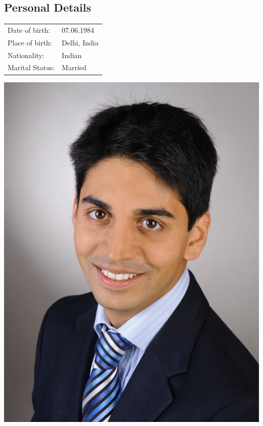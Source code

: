 \documentclass[11pt,a4paper]{article}
\begin{document}
\begin{center}
\begin{minipage}{1.0\textwidth}
\begin{minipage}{.50\textwidth}
\begin{minipage}{0.85\textwidth}
\section{Personal Details}
\begin{center}
\begin{minipage}{0.85\textwidth}
\begin{tabular}{ll}
	Date of birth:& 07.06.1984\\
	Place of birth:&  Delhi, India\\
	Nationality:& Indian\\
	Marital Status:& Married\\
\end{tabular}
\end{minipage}
\end{center}
\end{minipage}
\end{minipage}
\hspace{2cm}
\begin{minipage}{.5\textwidth}
\includegraphics[scale=0.2]{AnkitKaushik.jpeg}
\end{minipage}
\end{minipage}
\end{center}
\vspace{.2cm}
\end{document}
